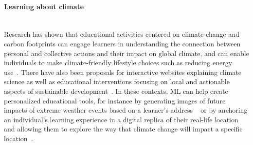 \documentclass[11pt]{report}
\begin{document}
\paragraph*{Learning about climate}
\label{sec:climate-ed}\mbox{}\\
Research has shown that educational activities centered on climate change and carbon footprints can engage learners in understanding the connection between personal and collective actions and their impact on global climate, and can enable individuals to make climate-friendly lifestyle choices such as reducing energy use~\cite{cordero2008}. There have also been proposals for interactive websites explaining climate science as well as educational interventions focusing on local and actionable aspects of sustainable development~\cite{anderson2012}. In these contexts, ML can help create personalized educational tools, for instance by generating images of future impacts of extreme weather events based on a learner's address ~\cite{schmidt2019visualizing} or by anchoring an individual's learning experience in a digital replica of their real-life location and allowing them to explore the way that climate change will impact a specific location~\cite{angel2015}.
\end{document}
